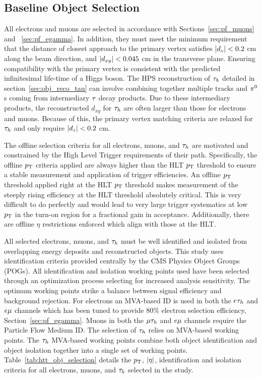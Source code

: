 \subsection{Baseline Object Selection}
\label{sec:htt_obj_sel}
All electrons and muons are selected in accordance with Sections~\ref{sec:pf_muons} and ~\ref{sec:pf_egamma}.
In addition, they must meet the minimum requirement
that the distance of closest approach to the primary vertex satisfies $\lvert d_z\rvert<0.2$ cm
along the beam direction, and $\lvert d_{xy}\rvert<0.045$ cm in the transverse plane. Ensuring
compatibility with the primary vertex is consistent with the predicted infinitesimal life-time of
a Higgs boson. The HPS reconstruction of $\tau_{h}$ detailed in section~\ref{sec:obj_reco_tau} can involve
combining together multiple tracks and $\pi^{0}$s coming from intermediary $\tau$ decay products.
Due to these intermediary products, the reconstructed $d_{xy}$ for $\tau_{h}$ are often
larger than those for electrons and muons. Because of this, the primary vertex matching
criteria are relaxed for $\tau_{h}$ and only require $\lvert d_z\rvert<0.2$ cm.

The offline selection criteria for all electrons, muons, and $\tau_{h}$ are motivated and constrained
by the High Level Trigger requirements of their path. Specifically, the offline $p_\mathrm{T}$ criteria
applied are always higher than the HLT $p_\mathrm{T}$ threshold to ensure a stable measurement and application
of trigger efficiencies. An offline $p_\mathrm{T}$ threshold applied right at the HLT $p_\mathrm{T}$ threshold
makes measurement of the steeply rising efficiency at the HLT threshold absolutely critical.
This is very difficult to do perfectly and would lead to very large trigger systematics
at low $p_\mathrm{T}$ in the turn-on region for a fractional gain in acceptance. 
Additionally, there are offline $\eta$ restrictions
enforced which align with those at the HLT.

All selected electrons, muons, and $\tau_{h}$ must be well identified and isolated from overlapping
energy deposits and reconstructed objects. This study uses identification criteria
provided centrally by the CMS Physics Object Groups (POGs). All identification and isolation
working points used have been selected through an optimization process selecting
for increased analysis sensitivity. The optimum working points strike a balance
between signal efficiency and background rejection. For electrons an MVA-based ID
is used in both the $e\tau_{h}$ and $e\mu$ channels which has been tuned to provide 
80\% electron selection efficiency, Section~\ref{sec:pf_egamma}. 
Muons in both the $\mu\tau_{h}$ and $e\mu$ channels
require the Particle Flow Medium ID. The selection of $\tau_{h}$ relies on MVA-based working
points. The $\tau_{h}$ MVA-based working points combine both object identification and object
isolation together into a single set of working points. Table~\ref{tab:htt_obj_selection}
details the $p_\mathrm{T}$, $\lvert\eta\rvert$, identification and isolation criteria for all electrons, muons,
and $\tau_{h}$ selected in the study.


